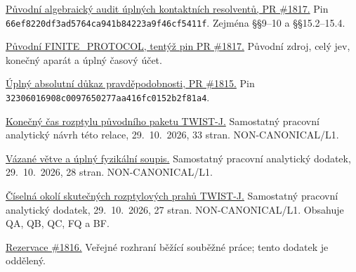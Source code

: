 \documentclass[11pt,a4paper]{article}
\theoremstyle{remark}\newtheorem{remark}[theorem]{Poznámka}
\numberwithin{equation}{section}
\begin{document}
\begin{description}[style=nextline,leftmargin=1.2cm]
\item[S1]
\href{https://github.com/mathorn1973/twist-j/blob/66ef8220df3ad5764ca941b84223a9f46cf5411f/notes/C-BOUND-PAIR-RESOLVENT-AUDIT-N/PROOF.md}
{Původní algebraický audit úplných kontaktních resolventů, PR \#1817.}
Pin \nolinkurl{66ef8220df3ad5764ca941b84223a9f46cf5411f}.
Zejména §§9--10 a §§15.2--15.4.

\item[S2]
\href{https://github.com/mathorn1973/twist-j/blob/66ef8220df3ad5764ca941b84223a9f46cf5411f/notes/C-BOUND-PAIR-RESOLVENT-AUDIT-N/FINITE_PROTOCOL.md}
{Původní FINITE\_PROTOCOL, tentýž pin PR \#1817.}
Původní zdroj, celý jev, konečný aparát a úplný časový účet.

\item[S3]
\href{https://github.com/mathorn1973/twist-j/blob/32306016908c0097650277aa416fc0152b2f81a4/notes/C-BOUND-PAIR-ABSOLUTE-CAPTURE-N/PROOF.md}
{Úplný absolutní důkaz pravděpodobnosti, PR \#1815.}
Pin \nolinkurl{32306016908c0097650277aa416fc0152b2f81a4}.

\item[S4]
\href{twist_j_konecny_cas.tex}
{Konečný čas rozptylu původního paketu TWIST-J.}
Samostatný pracovní analytický návrh této relace, 29.~10.~2026,
33 stran. NON-CANONICAL/L1.

\item[S5]
\href{twist_j_vazane_vetve.tex}
{Vázané větve a úplný fyzikální soupis.}
Samostatný pracovní analytický dodatek, 29.~10.~2026,
28 stran. NON-CANONICAL/L1.

\item[S6]
\href{twist_j_ciselne_prahy.tex}
{Číselná okolí skutečných rozptylových prahů TWIST-J.}
Samostatný pracovní analytický dodatek, 29.~10.~2026,
27 stran. NON-CANONICAL/L1. Obsahuje QA, QB, QC, FQ a BF.

\item[S7]
\href{https://github.com/mathorn1973/twist-j/issues/1816}{Rezervace \#1816.}
Veřejné rozhraní běžící souběžné práce; tento dodatek je oddělený.
\end{description}
\end{document}

